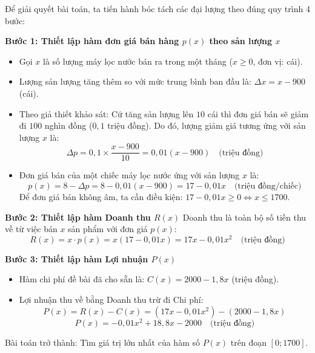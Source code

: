 \documentclass[12pt]{article}
\begin{document}
	\begin{loigiai}
		Để giải quyết bài toán, ta tiến hành bóc tách các đại lượng theo đúng quy trình 4 bước:
		
		\vspace{2mm}
		\textbf{Bước 1: Thiết lập hàm đơn giá bán hàng $p(x)$ theo sản lượng $x$}
		\begin{itemize}
			\item Gọi $x$ là số lượng máy lọc nước bán ra trong một tháng ($x \ge 0$, đơn vị: cái).
			\item Lượng sản lượng tăng thêm so với mức trung bình ban đầu là: $\Delta x = x - 900$ (cái).
			\item Theo giả thiết khảo sát: Cứ tăng sản lượng lên $10$ cái thì đơn giá bán sẽ giảm đi $100$ nghìn đồng ($0,1$ triệu đồng). Do đó, lượng giảm giá tương ứng với sản lượng $x$ là:
			\[ \Delta p = 0,1 \times \frac{x - 900}{10} = 0,01(x - 900) \quad \text{(triệu đồng)} \]
			\item Đơn giá bán của một chiếc máy lọc nước ứng với sản lượng $x$ là:
			\[ p(x) = 8 - \Delta p = 8 - 0,01(x - 900) = 17 - 0,01x \quad \text{(triệu đồng/chiếc)} \]
			Để đơn giá bán không âm, ta cần điều kiện: $17 - 0,01x \ge 0 \Leftrightarrow x \le 1700$.
		\end{itemize}
		
		\vspace{2mm}
		\textbf{Bước 2: Thiết lập hàm Doanh thu $R(x)$}
		Doanh thu là toàn bộ số tiền thu về từ việc bán $x$ sản phẩm với đơn giá $p(x)$:
		\[ R(x) = x \cdot p(x) = x(17 - 0,01x) = 17x - 0,01x^2 \quad \text{(triệu đồng)} \]
		
		\vspace{2mm}
		\textbf{Bước 3: Thiết lập hàm Lợi nhuận $P(x)$}
		\begin{itemize}
			\item Hàm chi phí đề bài đã cho sẵn là: $C(x) = 2000 - 1,8x$ (triệu đồng).
			\item Lợi nhuận thu về bằng Doanh thu trừ đi Chi phí:
			\[ P(x) = R(x) - C(x) = \left(17x - 0,01x^2\right) - \left(2000 - 1,8x\right) \]
			\[ P(x) = -0,01x^2 + 18,8x - 2000 \quad \text{(triệu đồng)} \]
		\end{itemize}
		Bài toán trở thành: Tìm giá trị lớn nhất của hàm số $P(x)$ trên đoạn $[0; 1700]$.
		

\end{loigiai}
\end{document}

